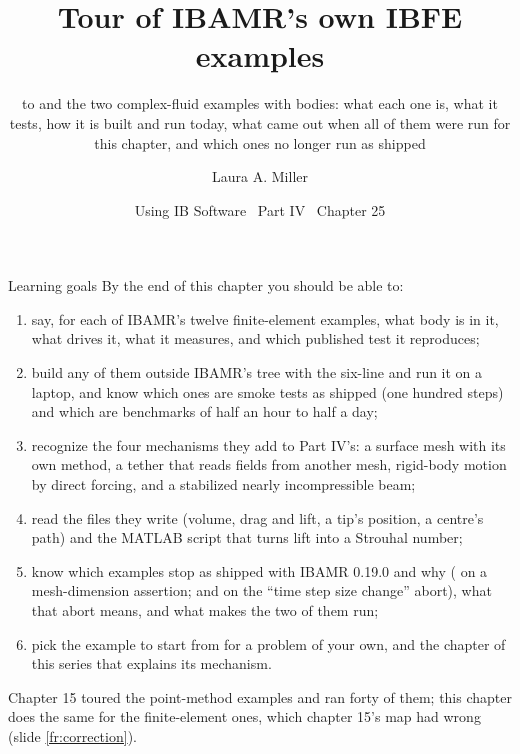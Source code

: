 \documentclass[aspectratio=169,11pt]{beamer}
\title[Tour of the upstream IBFE examples]{Tour of IBAMR's own IBFE examples}
\subtitle{\code{IBFE/explicit/ex0} to \code{ex11} and the two complex-fluid examples with bodies: what each one is, what it tests, how it is built and run today, what came out when all of them were run for this chapter, and which ones no longer run as shipped}
\author[Miller]{Laura A. Miller}
\institute[UArizona]{Department of Mathematics, University of Arizona}
\date{Using IB Software \textbullet\ Part IV \textbullet\ Chapter 25}
\begin{document}
\begin{frame}[plain]
\end{frame}

\begin{frame}{Learning goals}
\label{fr:goals}
\footnotesize By the end of this chapter you should be able to:
\begin{enumerate}
  \item say, for each of IBAMR's twelve finite-element examples, what body is in it, what drives it, what it measures, and which published test it reproduces;
  \item build any of them outside IBAMR's tree with the six-line  and run it on a laptop, and know which ones are smoke tests as shipped (one hundred steps) and which are benchmarks of half an hour to half a day;
  \item recognize the four mechanisms they add to Part IV's: a surface mesh with its own method, a tether that reads fields from another mesh, rigid-body motion by direct forcing, and a stabilized nearly incompressible beam;
  \item read the  files they write (volume, drag and lift, a tip's position, a centre's path) and the MATLAB script that turns lift into a Strouhal number;
  \item know which examples stop as shipped with IBAMR 0.19.0 and why ( on a mesh-dimension assertion;  and  on the ``time step size change'' abort), what that abort means, and what makes the two of them run;
  \item pick the example to start from for a problem of your own, and the chapter of this series that explains its mechanism.
\end{enumerate}
\begin{punchbox}
\scriptsize Chapter 15 toured the point-method examples and ran forty of them; this chapter does the same for the finite-element ones, which chapter 15's map had wrong (slide \ref{fr:correction}).
\end{punchbox}
\end{frame}
\end{document}
